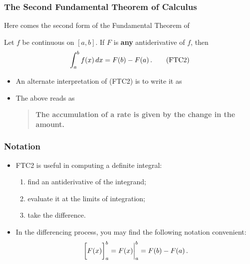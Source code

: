 \documentclass[10pt,t,handout,ignorenonframetext,aspectratio=169]{beamer}
\title[\course]{\lecTitle}
\institute[Ohio State]
{
  \medskip
}
\date[\week]{\semester}
\author{Tae Eun Kim, Ph.D.}
\begin{document}
\begin{frame}
  \titlepage
\end{frame}


\begin{frame}
  \frametitle{The Second Fundamental Theorem of Calculus}
  Here comes the second form of the Fundamental Theorem of
  \begin{thm}
    Let $f$ be continuous on $[a,b]$. If $F$ is \textbf{any}
    antiderivative of $f$, then
    \[
      \int_a^b f(x)\mathop{}\!d x = F(b)-F(a)\,. \tag{FTC2}
    \]
  \end{thm}

  \begin{itemize}
  \item An alternate interpretation of (FTC2) is to write it as
    \begin{image}[0.5\linewidth]
    \end{image}
  \item The above reads as
    \vspace{0.5em}
    \begin{center}
      \begin{minipage}{0.95\linewidth}
        \begin{quote}
          \textbf{The \textcolor{green!70!black!70!blue}{accumulation}
            of a \textcolor{blue!70!green}{rate} is given by the
            \textcolor{purple!50!blue!90!black}{change in the amount}.}
        \end{quote}
      \end{minipage}
    \end{center}
  \end{itemize}
\end{frame}


\begin{frame}
  \frametitle{Notation}
  \begin{itemize}
  \item FTC2 is useful in computing a definite integral:
    \begin{enumerate}
    \item find an antiderivative of the integrand;
    \item evaluate it at the limits of integration;
    \item take the difference.
    \end{enumerate}
  \item In the differencing process, you may find the following notation convenient:
    \[
      \bigg[ F(x) \bigg]_a^b = F(x) \bigg|_a^b = F(b) - F(a) \,.
    \]
  \end{itemize}
\end{frame}
\end{document}
